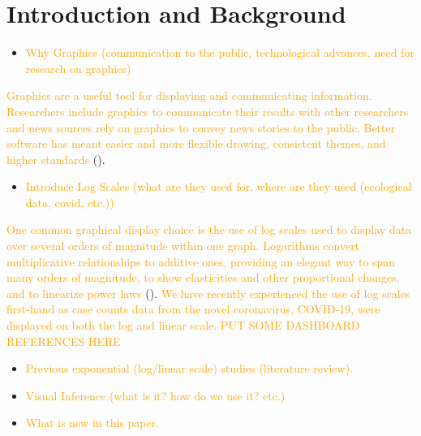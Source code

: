 \documentclass[]{interact}
\theoremstyle{plain}%
\theoremstyle{definition}
\theoremstyle{remark}
\begin{document}
\hypertarget{introduction-and-background}{%
\section{Introduction and
Background}\label{introduction-and-background}}

\begin{itemize}
\item
  \textcolor{Orange}{Why Graphics (communication to the public, technological advances, need for research on graphics)}
\end{itemize}

\textcolor{Orange}{Graphics are a useful tool for displaying and communicating information. Researchers include graphics to communicate their results with other researchers and news sources rely on graphics to convey news stories to the public. Better software has meant easier and more flexible drawing, consistent themes, and higher standards}
(\citet{unwin_why_2020}). \textcolor{Orange}{}

\begin{itemize}
\item
  \textcolor{Orange}{Introduce Log Scales (what are they used for, where are they used (ecological data, covid, etc.))}
\end{itemize}

\textcolor{Orange}{One common graphical display choice is the use of log scales used to display data over several orders of magnitude within one graph. Logarithms convert multiplicative relationships to additive ones, providing an elegant way to span many orders of magnitude, to show elasticities and other proportional changes, and to linearize power laws}
(\citet{menge_logarithmic_2018}).
\textcolor{Orange}{We have recently experienced the use of log scales first-hand as case counts data from the novel coronavirus, COVID-19, were displayed on both the log and linear scale. PUT SOME DASHBOARD REFERENCES HERE}

\begin{itemize}
\item
  \textcolor{Orange}{Previous exponential (log/linear scale) studies (literature review).}
\item
  \textcolor{Orange}{Visual Inference (what is it? how do we use it? etc.)}
\item
  \textcolor{Orange}{What is new in this paper.}
\end{itemize}

\citet{buja_statistical_2009}
\end{document}
